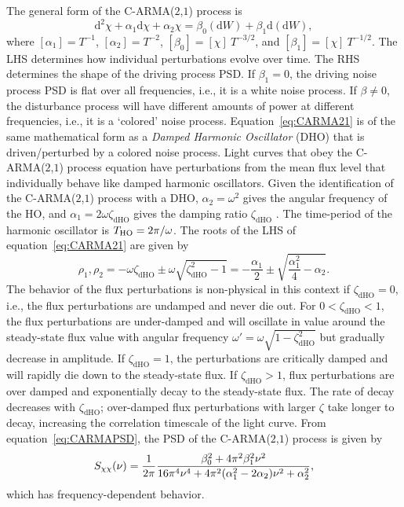 \documentclass[a4paper,fleqn,usenatbib]{mnras}
\begin{document}
The general form of the C-ARMA($2$,$1$) process is
\begin{equation}\label{eq:CARMA21}
\mathrm{d}^{2}\chi + \alpha_{1} \mathrm{d}\chi + \alpha_{2} \chi = \beta_{0}(\mathrm{d}W) + \beta_{1} \mathrm{d}(\mathrm{d}W),
\end{equation}
where $[\alpha_{1}] = T^{-1}$, $[\alpha_{2}] = T^{-2}$, $[\beta_{0}] = [\chi]~T^{-3/2}$, and $[\beta_{1}] = [\chi]~T^{-1/2}$. The LHS determines how individual perturbations evolve over time. The RHS determines the shape of the driving process PSD. If $\beta_{1} = 0$, the driving noise process PSD is flat over all frequencies, i.e., it is a white noise process. If $\beta \neq 0$, the disturbance process will have different amounts of power at different frequencies, i.e., it is a `colored' noise process. Equation~\eqref{eq:CARMA21} is of the same mathematical form as a \textit{Damped Harmonic Oscillator} (DHO) that is driven/perturbed by a colored noise process. Light curves that obey the C-ARMA($2$,$1$) process equation have perturbations from the mean flux level that individually behave like damped harmonic oscillators.
Given the identification of the  C-ARMA($2$,$1$) process with a DHO, $\alpha_{2} = \omega^{2}$ gives the angular frequency of the HO, and $\alpha_{1} = 2\omega\zeta_{\mathrm{dHO}}$ gives the damping ratio $\zeta_{\mathrm{dHO}}$ \citep[see chapter~7 for notation]{PanditWu}. The time-period of the harmonic oscillator is $T_{\mathrm{HO}} = 2 \pi/\omega$. The roots of the LHS of equation~\eqref{eq:CARMA21} are given by
\begin{equation}\label{eq:CARMA21Roots}
\rho_{1},\rho_{2} = -\omega\zeta_{\mathrm{dHO}} \pm \omega \sqrt{\zeta_{\mathrm{dHO}}^{2} - 1} = -\frac{\alpha_{1}}{2} \pm \sqrt{\frac{\alpha_{1}^{2}}{4} - \alpha_{2}}.
\end{equation}
The behavior of the flux perturbations is non-physical in this context if $\zeta_{\mathrm{dHO}} = 0$, i.e., the flux perturbations are undamped and never die out. For $0 < \zeta_{\mathrm{dHO}} < 1$, the flux perturbations are under-damped and will oscillate in value around the steady-state flux value with angular frequency $\omega' = \omega\sqrt{1 - \zeta_{\mathrm{dHO}}^{2}}$ but gradually decrease in amplitude. If $\zeta_{\mathrm{dHO}} = 1$, the perturbations are critically damped and will rapidly die down to the steady-state flux. If $\zeta_{\mathrm{dHO}} > 1$, flux perturbations are over damped and exponentially decay to the steady-state flux. The rate of decay decreases with $\zeta_{\mathrm{dHO}}$; over-damped flux perturbations with larger $\zeta$ take longer to decay, increasing the correlation timescale of the light curve. From equation~\eqref{eq:CARMAPSD}, the PSD of the C-ARMA($2$,$1$) process is given by
\begin{equation}\label{eq:CARMA21PSD}
S_{\chi\chi}(\nu) = \frac{1}{2\pi}\frac{\beta_{0}^{2} + 4\pi^{2}\beta_{1}^{2}\nu^{2}}{16\pi^{4}\nu^{4} + 4\pi^{2}(\alpha_{1}^{2}-2\alpha_{2})\nu^{2} + \alpha_{2}^{2}},
\end{equation}
which has frequency-dependent behavior.
\end{document}

